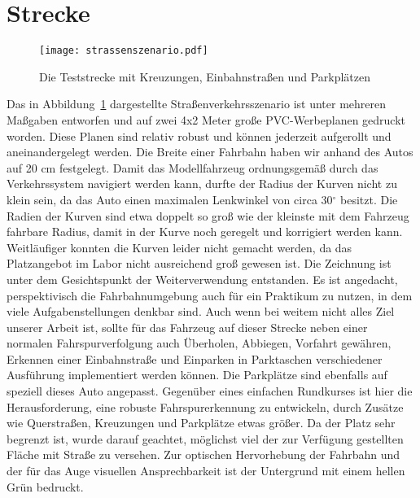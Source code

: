 \section{Strecke \dcfirstauthorshort}

\begin{figure}[H] %
  \centering
  \texttt{[image: strassenszenario.pdf]}
  \caption{Die Teststrecke mit Kreuzungen, Einbahnstraßen und Parkplätzen}
  \label{fig:strassenszenario}
\end{figure}

Das in Abbildung~\ref{fig:strassenszenario} dargestellte Straßenverkehrsszenario ist unter mehreren Maßgaben entworfen und auf zwei 4x2 Meter große PVC-Werbeplanen gedruckt worden. Diese Planen sind relativ robust und können jederzeit aufgerollt und aneinandergelegt werden. Die Breite einer Fahrbahn haben wir anhand des Autos auf 20 cm festgelegt. Damit das Modellfahrzeug ordnungsgemäß durch das Verkehrssystem navigiert werden kann, durfte der Radius der Kurven nicht zu klein sein, da das Auto einen maximalen Lenkwinkel von circa 30\(^\circ\) besitzt. Die Radien der Kurven sind etwa doppelt so groß wie der kleinste mit dem Fahrzeug fahrbare Radius, damit in der Kurve noch geregelt und korrigiert werden kann. Weitläufiger konnten die Kurven leider nicht gemacht werden, da das Platzangebot im Labor nicht ausreichend groß gewesen ist.
Die Zeichnung ist unter dem Gesichtspunkt der Weiterverwendung entstanden. Es ist angedacht, perspektivisch die Fahrbahnumgebung auch für ein Praktikum zu nutzen, in dem viele Aufgabenstellungen denkbar sind. Auch wenn bei weitem nicht alles Ziel unserer Arbeit ist, sollte für das Fahrzeug auf dieser Strecke neben einer normalen Fahrspurverfolgung auch Überholen, Abbiegen, Vorfahrt gewähren, Erkennen einer Einbahnstraße und Einparken in Parktaschen verschiedener Ausführung implementiert werden können. Die Parkplätze sind ebenfalls auf speziell dieses Auto angepasst. Gegenüber eines einfachen Rundkurses ist hier die Herausforderung, eine robuste Fahrspurerkennung zu entwickeln, durch Zusätze wie Querstraßen, Kreuzungen und Parkplätze etwas größer. Da der Platz sehr begrenzt ist, wurde darauf geachtet, möglichst viel der zur Verfügung gestellten Fläche mit Straße zu versehen. Zur optischen Hervorhebung der Fahrbahn und der für das Auge visuellen Ansprechbarkeit ist der Untergrund mit einem hellen Grün bedruckt.
